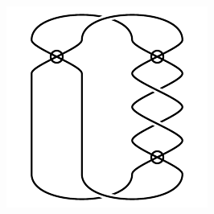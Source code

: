 \begin{figure}[H]
\begin{minipage}[b]{.18\linewidth}
\end{minipage}
\begin{minipage}[b]{.18\linewidth}
\centering
\includegraphics[width=\linewidth]{../data/virtual_4_101.png}
\end{minipage}
\end{figure}

